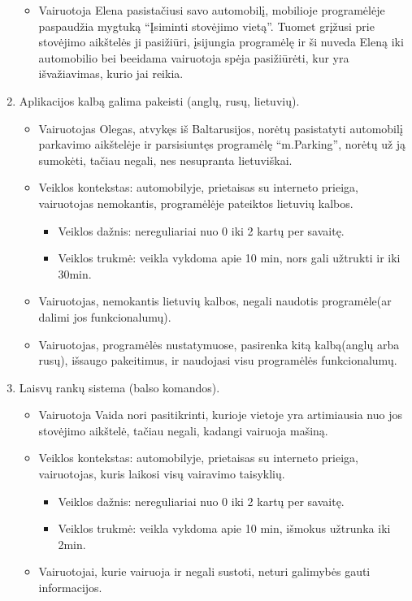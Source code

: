 \documentclass{VUMIFPSkursinis}
\begin{document}
\begin{enumerate}[label = \textbf{PV\arabic*.}]
\begin{itemize}[label={-}]
			\item Vairuotoja Elena pasistačiusi savo automobilį, mobilioje programėlėje paspaudžia mygtuką “Įsiminti stovėjimo vietą”. Tuomet grįžusi prie stovėjimo aikštelės ji pasižiūri, įsijungia programėlę ir ši nuveda Eleną iki automobilio bei beeidama vairuotoja spėja pasižiūrėti, kur yra išvažiavimas, kurio jai reikia.
			
		\end{itemize}
	\item Aplikacijos kalbą galima pakeisti (anglų, rusų, lietuvių).
		\begin{itemize}[label={-}]
			\item Vairuotojas Olegas, atvykęs iš Baltarusijos, norėtų pasistatyti automobilį parkavimo aikštelėje ir parsisiuntęs programėlę “m.Parking”, norėtų už ją sumokėti, tačiau negali, nes nesupranta lietuviškai.

			\item Veiklos kontekstas: automobilyje, prietaisas su interneto prieiga, vairuotojas nemokantis, programėlėje pateiktos lietuvių kalbos.
				\begin{itemize}[label={$\bullet$}]
					\item Veiklos dažnis: nereguliariai nuo 0 iki 2 kartų per savaitę.
					\item Veiklos trukmė: veikla vykdoma apie 10 min, nors gali užtrukti ir iki 30min.
				\end{itemize}
			\item Vairuotojas, nemokantis lietuvių kalbos, negali naudotis programėle(ar dalimi jos funkcionalumų).

			\item Vairuotojas, programėlės nustatymuose, pasirenka kitą kalbą(anglų arba rusų), išsaugo pakeitimus, ir naudojasi visu programėlės funkcionalumų.
			
		\end{itemize}
	\item Laisvų rankų sistema (balso komandos).
		\begin{itemize}[label={-}]
			\item Vairuotoja Vaida nori pasitikrinti, kurioje vietoje yra artimiausia nuo jos stovėjimo aikštelė, tačiau negali, kadangi vairuoja mašiną.

			\item Veiklos kontekstas: automobilyje, prietaisas su interneto prieiga, vairuotojas, kuris laikosi visų vairavimo taisyklių.
				\begin{itemize}[label={$\bullet$}]
					\item Veiklos dažnis: nereguliariai nuo 0 iki 2 kartų per savaitę.
					\item Veiklos trukmė: veikla vykdoma apie 10 min, išmokus užtrunka iki 2min.
				\end{itemize}
			\item Vairuotojai, kurie vairuoja ir negali sustoti, neturi galimybės gauti informacijos.


\end{itemize}
\end{enumerate}
\end{document}
